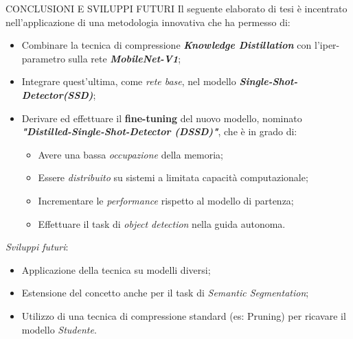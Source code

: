 \begin{frame}{CONCLUSIONI E SVILUPPI FUTURI}
    Il seguente elaborato di tesi è incentrato nell'applicazione di una metodologia innovativa che ha permesso di:
    \begin{itemize}
        \item Combinare la tecnica di compressione {\bfseries{\emph{Knowledge Distillation}}} con l'iper-parametro \boldsymbol{$\alpha$} sulla rete {\bfseries{\emph{MobileNet-V1}}};
        \item Integrare quest'ultima, come \emph{rete base}, nel modello {\bfseries{\emph{Single-Shot-Detector(SSD)}}};
        \item Derivare ed effettuare il {\bfseries{fine-tuning}} del nuovo modello, nominato {\bfseries{\emph{"Distilled-Single-Shot-Detector (DSSD)"}}}, che è in grado di:
        \begin{itemize}
            \item Avere una bassa \emph{occupazione} della memoria;
            \item Essere \emph{distribuito} su sistemi a limitata capacità computazionale;
            \item Incrementare le \emph{performance} rispetto al modello di partenza;
            \item Effettuare il task di \emph{object detection} nella guida autonoma.
        \end{itemize}
    \end{itemize}
    \vspace{0.3cm}
    \emph{Sviluppi futuri}:
    \begin{itemize}
        \item Applicazione della tecnica su modelli diversi;
        \item Estensione del concetto anche per il task di \emph{Semantic Segmentation};
        \item Utilizzo di una tecnica di compressione standard (es: Pruning) per ricavare il modello \emph{Studente}.
    \end{itemize}
\end{frame}